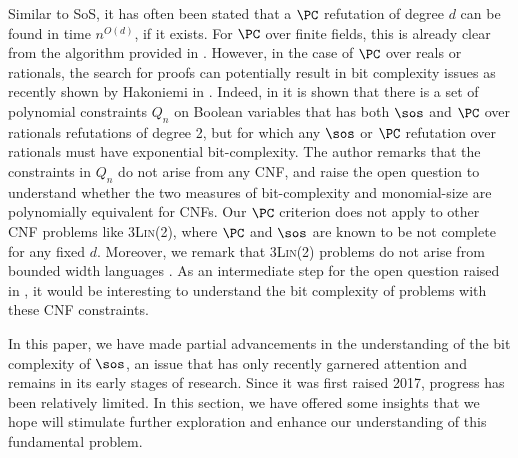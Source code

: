 \documentclass[11pt]{article}
\begin{document}
Similar to SoS, it has often been stated that a $\PC$ refutation of degree $d$ can be found in time $n^{O(d)}$, if it exists. For $\PC$ over finite fields, this is already clear from the algorithm provided in \cite{CleggEI96}. However, in the case of $\PC$ over reals or rationals, the search for proofs can potentially result in bit complexity issues as recently shown by Hakoniemi in \cite{Hakoniemi21}. Indeed, in \cite{Hakoniemi21} it is shown that there is a set of polynomial constraints $Q_n$ on Boolean variables that has both $\sos$ and $\PC$ over rationals refutations of degree 2, but for which any $\sos$ or $\PC$ refutation over rationals must have exponential bit-complexity. The author remarks that the constraints in $Q_n$ do not arise from any CNF, and raise the open question to understand whether the
two measures of bit-complexity and monomial-size are polynomially equivalent for CNFs. Our $\PC$ criterion does not apply to other CNF problems like \textsc{3Lin(2)}, where $\PC$ and $\sos$ are known to be not complete for any fixed $d$. Moreover, we remark that \textsc{3Lin(2)} problems do not arise from bounded width languages \cite{BartoK14}.
As an intermediate step for the open question raised in \cite{Hakoniemi21}, it would be interesting to understand the bit complexity of problems with these CNF constraints.


In this paper, we have made partial advancements in the understanding of the bit complexity of \(\sos\), an issue that has only recently garnered attention and remains in its early stages of research. Since it was first raised 2017, progress has been relatively limited. In this section, we have offered some insights that we hope will stimulate further exploration and enhance our understanding of this fundamental problem.
\end{document}
